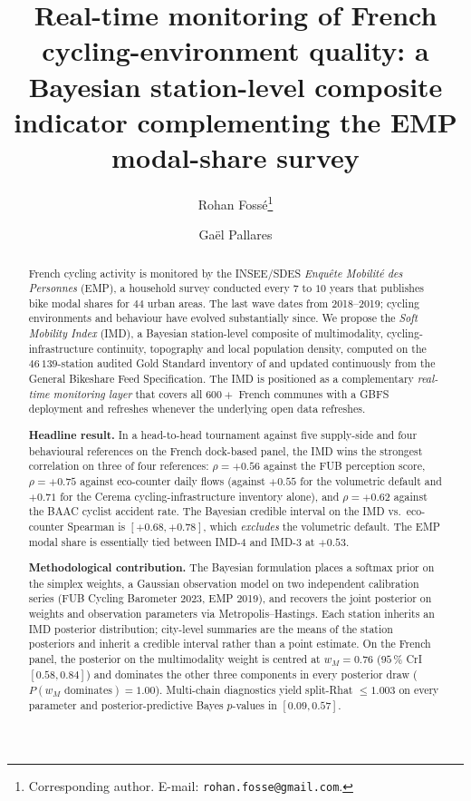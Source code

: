 \documentclass[11pt,a4paper]{article}
\title{Real-time monitoring of French cycling-environment quality:
       a Bayesian station-level composite indicator complementing
       the EMP modal-share survey}
\author[1]{Rohan Foss\'e\thanks{Corresponding author. E-mail:
            \texttt{rohan.fosse@gmail.com}.}}
\author[1]{Ga\"el Pallares}
\affil[1]{CESI LINEACT, BikeShare-ICT research programme,
          Montpellier, France}
\date{}
\begin{document}
\maketitle

\begin{abstract}
\noindent
French cycling activity is monitored by the INSEE/SDES
\emph{Enqu\^ete Mobilit\'e des Personnes} (EMP), a household
survey conducted every $7$ to $10$ years that publishes bike
modal shares for $44$ urban areas. The last wave dates from
2018--2019; cycling environments and behaviour have evolved
substantially since. We propose the \emph{Soft Mobility Index}
(IMD), a Bayesian station-level composite of multimodality,
cycling-infrastructure continuity, topography and local
population density, computed on the $46\,139$-station audited
Gold Standard inventory of \citet{Fosse2026gold} and updated
continuously from the General Bikeshare Feed Specification.
The IMD is positioned as a complementary \emph{real-time
monitoring layer} that covers all $600+$ French communes with a
GBFS deployment and refreshes whenever the underlying open data
refreshes.

\textbf{Headline result.} In a head-to-head tournament against
five supply-side and four behavioural references on the French
dock-based panel, the IMD wins the strongest correlation on
three of four references: $\rho = +0.56$ against the FUB
perception score, $\rho = +0.75$ against eco-counter daily
flows (against $+0.55$ for the volumetric default and $+0.71$
for the Cerema cycling-infrastructure inventory alone), and
$\rho = +0.62$ against the BAAC cyclist accident rate. The
Bayesian credible interval on the IMD vs.\ eco-counter Spearman
is $[+0.68, +0.78]$, which \emph{excludes} the volumetric
default. The EMP modal share is essentially tied between
IMD-4 and IMD-3 at $+0.53$.

\textbf{Methodological contribution.} The Bayesian formulation
places a softmax prior on the simplex weights, a Gaussian
observation model on two independent calibration series (FUB
Cycling Barometer 2023, EMP 2019), and recovers the joint
posterior on weights and observation parameters via
Metropolis--Hastings. Each station inherits an IMD posterior
distribution; city-level summaries are the means of the station
posteriors and inherit a credible interval rather than a point
estimate. On the French panel, the posterior on the
multimodality weight is centred at $w_M = 0.76$
($95\,\%$ CrI $[0.58, 0.84]$) and dominates the other three
components in every posterior draw
($P(w_M \text{ dominates}) = 1.00$). Multi-chain diagnostics
yield split-Rhat $\leq 1.003$ on every parameter and
posterior-predictive Bayes $p$-values in $[0.09, 0.57]$.


\end{abstract}
\end{document}
